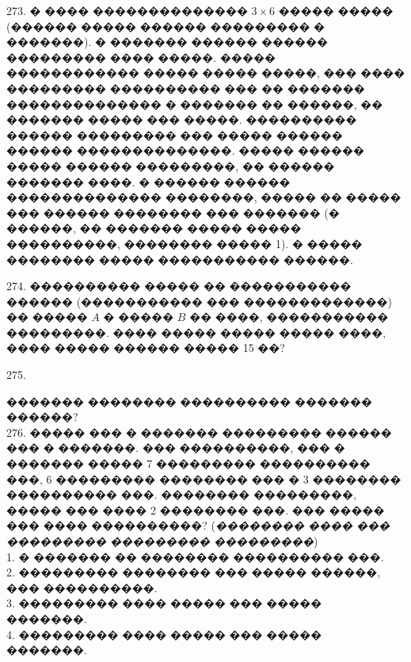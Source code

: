\documentclass[12pt]{article}
\begin{document}
\begin{center}
\begin{figure}[ht!]
\end{figure}
\end{center}
273. � ���� �������������� $3\times6$ ����� ����� (������ ����� ������ ��������� � �������). � ������� ������ ������ ��������� ���� �����. ����� ������������ ����� ����� �����, ��� ���� ��������� ���������� ��� �� ������� �������������� � ������� �� ������, �� ������� ����� ��� �����. ���������� ������ ��������� ��� ����� ������ ������ ��������������. ����� ������ ����� ������ ���������, �� ������ ������� ����. � ������ ������ �������������� ��������, ����� �� ����� ��� ������ �������� ��� ������� (� ������, �� ������� ����� ����� ����������, �������� ����� 1). � ����� �������� ����� ����������� ������.
\begin{center}
\begin{figure}[ht!]
\end{figure}
\end{center}
274. ���������� ����� �� ����������� ������ (����������� ��� �������������) �� ����� $A$ � ����� $B$ �� ����, ����������� ���������. ���� ����� ����� ����� ����, ���� ����� ������ ����� 15 ��?
\begin{center}
\begin{figure}[ht!]
\end{figure}
\end{center}
275. \begin{center}
\begin{figure}[ht!]
\end{figure}
\end{center}
������� �������� ���������� ������� ������?\\
276. ����� ��� � ������� ��������� ������ ��� � �������. ��� ����������, ��� � ������� ����� 7 ��������� ���������� ���, 6 ��������� �������� ��� � 3 �������� ���������� ���. �������� ���������, ����� ��� ���� 2 �������� ���. ��� ����� ��� ���� ����������? ({\it �������� ���� ��� ��������� ��������� ���������})\\
1. � ������� �� �������� ���������� ���.\\
2. ��������� �������� ��� ����� ������, ��� ����������.\\
3. ��������� ���� ����� ��� ����� �������.\\
4. ��������� ���� ����� ��� ����� �������.\\
\end{document}
